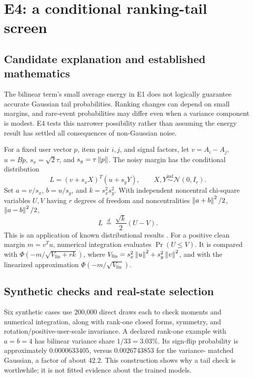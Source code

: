 \section{E4: a conditional ranking-tail screen}
\label{sec:e4}
\subsection{Candidate explanation and established mathematics}
The bilinear term's small average energy in E1 does not logically guarantee
accurate Gaussian tail probabilities. Ranking changes can depend on small
margins, and rare-event probabilities may differ even when a variance
component is modest. E4 tests this narrower possibility rather than assuming
the energy result has settled all consequences of non-Gaussian noise.

For a fixed user vector $p$, item pair $i,j$, and signal factors, let
$v=A_i-A_j$, $u=Bp$, $s_x=\sqrt{2}\tau$, and $s_y=\tau\left\lVert p\right\rVert$.
The noisy margin has the conditional distribution
\begin{equation}
 L=(v+s_xX)^T(u+s_yY),\qquad X,Y\stackrel{\mathrm{ind}}{\sim}\mathcal N(0,I_r).
 \label{eq:tailmargin}
\end{equation}
Set $a=v/s_x$, $b=u/s_y$, and $k=s_x^2s_y^2$. With independent
noncentral chi-square variables $U,V$ having $r$ degrees of freedom and
noncentralities $\left\lVert a+b\right\rVert^2/2$, $\left\lVert a-b\right\rVert^2/2$,
\begin{equation}
 L\ \overset{d}{=}\ \frac{\sqrt{k}}{2}(U-V).
 \label{eq:chisquare}
\end{equation}
This is an application of known distributional results
\citep{gaunt2024product}. For a positive clean margin $m=v^Tu$, numerical
integration evaluates $\Pr(U\leq V)$. It is compared with
$\Phi(-m/\sqrt{V_{\mathrm{lin}}+rk})$, where
$V_{\mathrm{lin}}=s_x^2\left\lVert u\right\rVert^2+s_y^2\left\lVert v\right\rVert^2$, and with the
linearized approximation $\Phi(-m/\sqrt{V_{\mathrm{lin}}})$.

\subsection{Synthetic checks and real-state selection}
Six synthetic cases use 200,000 direct draws each to check moments and
numerical integration, along with rank-one closed forms, symmetry, and
rotation/positive-user-scale invariance. A declared rank-one example with
$a=b=4$ has bilinear variance share $1/33=3.03$\%. Its sign-flip probability
is approximately $0.0000633405$, versus $0.0026743853$ for the variance-
matched Gaussian, a factor of about 42.2. This construction shows why a
tail check is worthwhile; it is not fitted evidence about the trained models.

